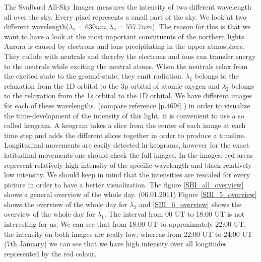 \documentclass[10pt,a4paper]{article}
\begin{document}
The Svalbard All-Sky Imager measures the intensity of two different wavelength all over the sky. Every pixel represents a small part of the sky. We look at two different 
wavelength($\lambda_1=630 nm, \lambda_2= 557.7 nm$). The reason for this is that we want to have a look at the most important constituents of the northern lights. 
Aurora is caused by electrons and ions precipitating in the upper atmosphere. They collide with neutrals and thereby the electrons and ions can transfer energy to the neutrals while exciting the neutral atoms. When the neutrals relax from the excited state to the ground-state, they emit radiation. 
$\lambda_1$ belongs to the relaxation from the 1D orbital to the 3p orbital of atomic oxygen and $\lambda_2$ belongs to the relaxation from the 1s orbital to the 1D 
orbital. We have different images for each of these wavelengths. (compare reference \cite{Buch2}[p.469f] )
in order to visualize the time-development of the intensity of this light, it is convenient to use a so called keogram. A keogram takes a slice from the center of each 
image at each time  step and adds the different slices together in order to produce a timeline. Longitudinal movements are easily detected in keograms, however for 
the exact latitudinal movements one should check the full images. In the images, red areas represent relatively high intensity of the specific wavelength and black 
relatively low intensity. We should keep in mind that the intensities are rescaled for every picture in order to have a better visualization. 
The figure \ref{SBI_all_overview} shows a general overview of the whole day. (06.01.2011) Figure \ref{SBI_5_overview} shows the overview of the whole day for 
$\lambda_2$ and \ref{SBI_6_overview} shows the overview of the whole day for $\lambda_1$. The interval from 00 UT to 18:00 UT is not interesting for us. 
We can see that from 18:00 UT to approximately 22:00 UT, the intensity on both images are really low; whereas from 22:00 UT to 24:00 UT (7th January) 
we can see that we have high intensity over all longitudes represented by the red colour.
\end{document}
